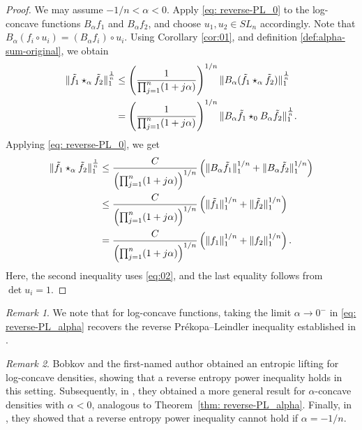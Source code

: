 \documentclass[11pt]{amsart}
\theoremstyle{plain}
\theoremstyle{definition}
\theoremstyle{remark}
\newtheorem{remark}{Remark}
\begin{document}
\begin{proof}
    We may assume $-1 / n<\alpha<0$. Apply \eqref{eq: reverse-PL_0} to the log-concave functions $B_\alpha f_1$ and $B_\alpha f_2$, and choose $u_1, u_2 \in S L_n$ accordingly. Note that $B_\alpha\left(f_i \circ u_i\right)=\left(B_\alpha f_i\right) \circ u_i$.
    Using Corollary \ref{cor:01}, and definition \eqref{def:alpha-sum-original}, we obtain
    \begin{align}
        \| \Tilde{{f}_1} \star_\alpha \Tilde{{f}_2}\|_1^{\frac{1}{n}}
        &\leq
        \left(\frac{1}{\prod_{j=1}^n(1+j \alpha)}\right)^{1/n}
        \| B_\alpha (\Tilde{{f}_1} \star_\alpha \Tilde{{f}_2} )\|_1^{\frac{1}{n}}
        \\
        &=
        \left(\frac{1}{\prod_{j=1}^n(1+j \alpha)}\right)^{1/n}
        \| B_\alpha \Tilde{{f}_1}   \star_0 B_\alpha \Tilde{{f}_2} \|_1^{\frac{1}{n}} .
    \end{align}
    Applying \eqref{eq: reverse-PL_0}, we get
    \begin{align}
        \| \Tilde{{f}_1} \star_\alpha \Tilde{{f}_2}\|_1^{\frac{1}{n}}
        &\leq
        \frac{C}{\left(\prod_{j=1}^n(1+j \alpha)\right)^{1/n}}
        \left( \|B_\alpha \Tilde{{f}_1}  \|_1^{1/n} + \|B_\alpha \Tilde{{f}_2}  \|_1^{1/n}\right)
        \nonumber
        \\
        &\leq
        \frac{C}{\left(\prod_{j=1}^n(1+j \alpha)\right)^{1/n}}
        \left( \|\Tilde{f}_1 \|_1^{1/n} +\|\Tilde{f}_2 \|_1^{1/n} \right)
        \\
        &=
        \frac{C}{\left(\prod_{j=1}^n(1+j \alpha)\right)^{1/n}}
        \left( \|{f}_1 \|_1^{1/n} +\|{f}_2 \|_1^{1/n} \right).
    \end{align}
    Here, the second inequality uses \eqref{eq:02}, and the last equality follows from $\operatorname{det} u_i=1$.
\end{proof}

\begin{remark}
    We note that for log-concave functions, taking the limit $\alpha \to 0^-$ in \eqref{eq: reverse-PL_alpha} recovers the reverse Pr\'ekopa–Leindler inequality established in \cite{KM-05}.
\end{remark}

\begin{remark}
    Bobkov and the first-named author \cite{BM11-cras} obtained an entropic lifting for log-concave densities, showing that a reverse entropy power inequality holds in this setting.
    Subsequently, in \cite{BM-12}, they obtained a more general result for $\alpha$-concave densities with $\alpha<0$, analogous to Theorem~\ref{thm: reverse-PL_alpha}. Finally, in \cite{BM-13}, they showed that a reverse entropy power inequality cannot hold if $\alpha=-1/n$.
\end{remark}
\end{document}
